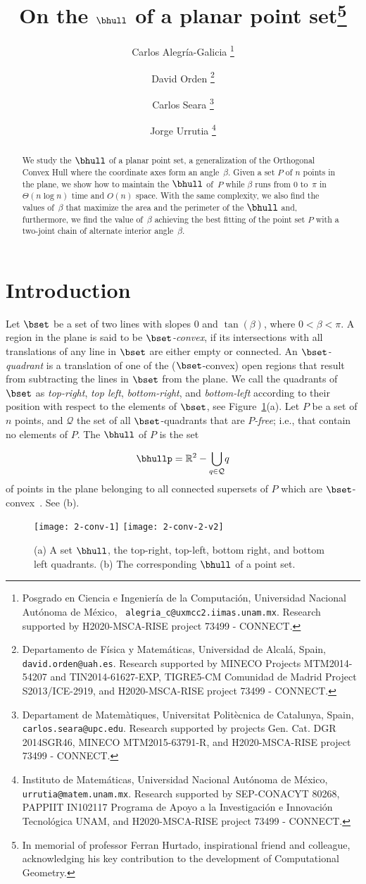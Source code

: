 \documentclass[11pt,letterpaper,english]{article}
\title{On the $\bhull$ of a planar point set\footnote{In memorial of professor Ferran Hurtado, inspirational friend and colleague, acknowledging his key contribution to the development of Computational Geometry.}}
\author{
  Carlos Alegr\'{i}a-Galicia
  \thanks{Posgrado en Ciencia e Ingenier\'{i}a de la Computaci\'on,
    Universidad Nacional Aut\'onoma de M\'exico, {\tt
      alegria\_c@uxmcc2.iimas.unam.mx}. Research supported by H2020-MSCA-RISE project 73499 - CONNECT.}
  \and
  David Orden
  \thanks{Departamento de F\'{i}sica y Matem\'aticas, Universidad de
    Alcal\'a, Spain, {\tt david.orden@uah.es}. Research supported by MINECO Projects
    MTM2014-54207 and TIN2014-61627-EXP, TIGRE5-CM Comunidad de Madrid Project S2013/ICE-2919, and H2020-MSCA-RISE project 73499 - CONNECT.}
  \and
  Carlos Seara
  \thanks{Departament de Matem\`atiques, Universitat
    Polit\`ecnica de Catalunya, Spain, {\tt
      carlos.seara@upc.edu}. Research supported by projects Gen. Cat. DGR 2014SGR46,
      MINECO MTM2015-63791-R, and H2020-MSCA-RISE project 73499 - CONNECT.}
  \and
  Jorge Urrutia
  \thanks{Instituto de Matem\'aticas, Universidad Nacional Aut\'onoma
    de M\'exico, {\tt urrutia@matem.unam.mx}. Research supported by SEP-CONACYT 80268, PAPPIIT IN102117 Programa de Apoyo a la Investigaci\'on e Innovaci\'on Tecnol\'ogica UNAM, and H2020-MSCA-RISE project 73499 - CONNECT.}}
\date{}
\theoremstyle{definition}
\begin{document}
\begin{abstract}
We study the $\bhull$ of a planar point set, a generalization of the
Orthogonal Convex Hull where the coordinate axes form an angle~$\beta$.
Given a set $P$ of $n$ points in the plane, we show how to maintain
the $\bhull$ of~$P$ while $\beta$ runs from $0$ to~$\pi$ in
$\Theta(n\log n)$ time and $O(n)$ space.
With the same complexity, we also find the values of~$\beta$
that maximize the area and the perimeter of the $\bhull$ and,
furthermore, we find the value of~$\beta$ achieving the best fitting
of the point set $P$ with a two-joint chain of alternate interior angle~$\beta$.
\end{abstract}

\section{Introduction}\label{sec:intro}

Let $\bset$ be a set of two lines with slopes $0$ and $\tan(\beta)$,
where $0 < \beta < \pi$. A region in the plane is said to be
\emph{$\bset$-convex}, if its intersections with all translations of
any line in $\bset$ are either empty or connected. An
\emph{$\bset$-quadrant} is a translation of one of the
($\bset$-convex) open regions that result from subtracting the lines
in $\bset$ from the plane. We call the quadrants of $\bset$
as \emph{top-right}, \emph{top left}, \emph{bottom-right}, and \emph{bottom-left}
according to their position with respect to the elements of $\bset$,
see Figure~\ref{intro:fig:bhull}(a).
Let $P$ be a set of $n$ points, and
$\mathcal{Q}$ the set of all $\bset$-quadrants that are
\emph{$P$-free}; i.e., that contain no elements of $P$. The
\emph{$\bhull$} of $P$ is the set

$$\displaystyle
\mbox{\ensuremath{\bhullp}}=\mathbb{R}^{2}-\underset{q\in\mathcal{Q}}{\bigcup}q
$$
of points in the plane belonging to all connected
supersets of $P$ which are
$\bset$-convex~\cite{alegria_2014,ottmann_1984}. See
(b).

\begin{figure}[ht]
  \centering
  \subcaptionbox{\label{intro:fig:bhull:1}}
  {\texttt{[image: 2-conv-1]}}
  \hspace{2cm}
  \subcaptionbox{\label{intro:fig:bhull:2}}
  {\texttt{[image: 2-conv-2-v2]}}
  \caption{(a) A set $\bhull$, the top-right, top-left, bottom right, and bottom left quadrants. (b) The corresponding $\bhull$ of a point set.}
  \label{intro:fig:bhull}
\end{figure}
\end{document}
